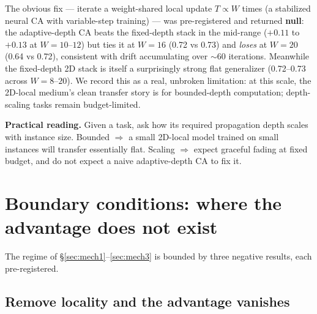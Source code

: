 \documentclass[11pt]{article}
\begin{document}
The obvious fix --- iterate a weight-shared local update $T \propto W$ times
(a stabilized neural CA with variable-step training) --- was pre-registered
and returned \textbf{null}: the adaptive-depth CA beats the fixed-depth stack
in the mid-range ($+0.11$ to $+0.13$ at $W = 10$--$12$) but ties it at
$W = 16$ (0.72 vs 0.73) and \emph{loses} at $W = 20$ (0.64 vs 0.72),
consistent with drift accumulating over $\sim$60 iterations. Meanwhile the
fixed-depth 2D stack is itself a surprisingly strong flat generalizer
(0.72--0.73 across $W = 8$--$20$). We record this as a real, unbroken
limitation: at this scale, the 2D-local medium's clean transfer story is for
bounded-depth computation; depth-scaling tasks remain budget-limited.

\textbf{Practical reading.} Given a task, ask how its required propagation
depth scales with instance size. Bounded $\Rightarrow$ a small 2D-local model
trained on small instances will transfer essentially flat. Scaling
$\Rightarrow$ expect graceful fading at fixed budget, and do not expect a
naive adaptive-depth CA to fix it.

\section{Boundary conditions: where the advantage does not exist}\label{sec:boundary}

The regime of \S\ref{sec:mech1}--\ref{sec:mech3} is bounded by three negative
results, each pre-registered.

\subsection{Remove locality and the advantage vanishes}\label{sec:boundary-global}
\end{document}
